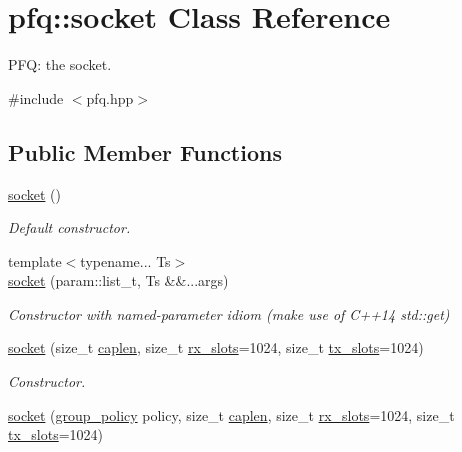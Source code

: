 \hypertarget{classpfq_1_1socket}{\section{pfq\+:\+:socket Class Reference}
\label{classpfq_1_1socket}
}


P\+F\+Q\+: the socket.  




{\ttfamily \#include $<$pfq.\+hpp$>$}

\subsection*{Public Member Functions}
\begin{DoxyCompactItemize}
\item 
\hyperlink{classpfq_1_1socket_a169a46cd01a5fd0a71919ece48f18d9d}{socket} ()
\begin{DoxyCompactList}\small\item\em Default constructor. \end{DoxyCompactList}\item 
{\footnotesize template$<$typename... Ts$>$ }\\\hyperlink{classpfq_1_1socket_aa53695f39b45a0fa9520d52a1a35d2bf}{socket} (param\+::list\+\_\+t, Ts \&\&...args)
\begin{DoxyCompactList}\small\item\em Constructor with named-\/parameter idiom (make use of C++14 std\+::get) \end{DoxyCompactList}\item 
\hyperlink{classpfq_1_1socket_ad0e09474a9919723dfdf142e2b1e5386}{socket} (size\+\_\+t \hyperlink{classpfq_1_1socket_ab68dbba5ef01041b9c96758c4a9f0a6c}{caplen}, size\+\_\+t \hyperlink{classpfq_1_1socket_a5cf700fc12d67b91df3d669ac4aa737a}{rx\+\_\+slots}=1024, size\+\_\+t \hyperlink{classpfq_1_1socket_a019d15a072c043d6a1333ca0c836da4c}{tx\+\_\+slots}=1024)
\begin{DoxyCompactList}\small\item\em Constructor. \end{DoxyCompactList}\item 
\hyperlink{classpfq_1_1socket_a419985e445525a7dbfae6d9ace452427}{socket} (\hyperlink{namespacepfq_ac41249c8510558905b01fa4d866a38d7}{group\+\_\+policy} policy, size\+\_\+t \hyperlink{classpfq_1_1socket_ab68dbba5ef01041b9c96758c4a9f0a6c}{caplen}, size\+\_\+t \hyperlink{classpfq_1_1socket_a5cf700fc12d67b91df3d669ac4aa737a}{rx\+\_\+slots}=1024, size\+\_\+t \hyperlink{classpfq_1_1socket_a019d15a072c043d6a1333ca0c836da4c}{tx\+\_\+slots}=1024)

\end{DoxyCompactItemize}
